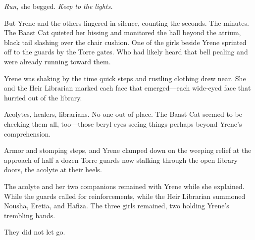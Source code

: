 \emph{Run}, she begged.
\emph{Keep to the lights.}

But Yrene and the others lingered in silence, counting the seconds.
The minutes.
The Baast Cat quieted her hissing and monitored the hall beyond the atrium, black tail slashing over the chair cushion.
One of the girls beside Yrene sprinted off to the guards by the Torre gates.
Who had likely heard that bell pealing and were already running toward them.

Yrene was shaking by the time quick steps and rustling clothing drew near.
She and the Heir Librarian marked each face that emerged---each wide-eyed face that hurried out of the library.

Acolytes, healers, librarians.
No one out of place.
The Baast Cat seemed to be checking them all, too---those beryl eyes seeing things perhaps beyond Yrene's comprehension.

Armor and stomping steps, and Yrene clamped down on the weeping relief at the approach of half a dozen Torre guards now stalking through the open library doors, the acolyte at their heels.

The acolyte and her two companions remained with Yrene while she explained.
While the guards called for reinforcements, while the Heir Librarian summoned Nousha, Eretia, and Hafiza.
The three girls remained, two holding Yrene's trembling hands.

They did not let go.

